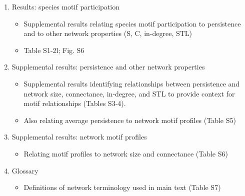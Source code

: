 \documentclass[12pt]{article}
\begin{document}
\begin{spacing}{2.0}
{\begin{spacing}{1.0}
\begin{enumerate}
            \begin{itemize}
                \item Describes GLMs summarising how the relationship between motif participation and persistence varies over S and C, to complement the within-network results presented in the main text (Eqn. S7)
                \item Plots of these GLMs for each motif (Figs. S2-5)
            \end{itemize}    


        \item Results: species motif participation 
            \begin{itemize}
                \item Supplemental results relating species motif participation to persistence and to other network properties (S, C, in-degree, STL)
                \item Table S1-2l; Fig. S6
            \end{itemize}

    
        \item Supplemental results: persistence and other network properties

            \begin{itemize}
                \item Supplemental results identifying relationships between persistence and network size, connectance, in-degree, and STL to provide context for motif relationships (Tables S3-4).
                \item Also relating average persistence to network motif profiles (Table S5)
            \end{itemize}    

    
        \item Supplemental results: network motif profiles

            \begin{itemize}
                \item Relating motif profiles  to network size and connectance (Table S6)
            \end{itemize}


        \item Glossary    

            \begin{itemize}
                \item Definitions of network terminology used in main text (Table S7)
            \end{itemize}



\end{enumerate}
\end{spacing}}
\end{spacing}
\end{document}
